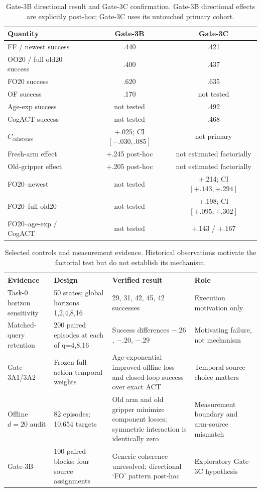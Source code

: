 \begin{table}[t]
\caption{Gate-3B directional result and Gate-3C confirmation. Gate-3B
directional effects are explicitly post-hoc; Gate-3C uses its untouched primary
cohort.}
\label{tab:directional_result}
\centering
\scriptsize
\setlength{\tabcolsep}{3.5pt}
\begin{tabular}{lcc}
\toprule
Quantity & Gate-3B & Gate-3C \\
\midrule
FF / newest success & .440 & .421 \\
OO20 / full old20 success & .400 & .437 \\
FO20 success & .620 & .635 \\
OF success & .170 & not tested \\
Age-exp success & not tested & .492 \\
CogACT success & not tested & .468 \\
\midrule
$C_{\mathrm{coherence}}$ & +.025; CI $[-.030,.085]$ & not primary \\
Fresh-arm effect & +.245 post-hoc & not estimated factorially \\
Old-gripper effect & +.205 post-hoc & not estimated factorially \\
FO20--newest & not tested & +.214; CI $[+.143,+.294]$ \\
FO20--full old20 & not tested & +.198; CI $[+.095,+.302]$ \\
FO20--age-exp / CogACT & not tested & +.143 / +.167 \\
\bottomrule
\end{tabular}
\end{table}

\begin{table}[t]
\caption{Selected controls and measurement evidence. Historical observations
motivate the factorial test but do not establish its mechanism.}
\label{tab:project_controls}
\centering
\scriptsize
\setlength{\tabcolsep}{4pt}
\begin{tabular}{p{}p{}p{}p{}}
\toprule
Evidence & Design & Verified result & Role \\
\midrule
Task-0 horizon sensitivity & 50 states; global horizons 1,2,4,8,16 &
29, 31, 42, 45, 42 successes & Execution motivation only \\
Matched-query retention & 200 paired episodes at each of q=4,8,16 &
Success differences $-.26$, $-.20$, $-.29$ & Motivating failure, not mechanism \\
Gate-3A1/3A2 & Frozen full-action temporal weights &
Age-exponential improved offline loss and closed-loop success over exact ACT &
Temporal-source choice matters \\
Offline $d=20$ audit & 82 episodes; 10,654 targets &
Old arm and old gripper minimize component losses; symmetric interaction is
identically zero & Measurement boundary and arm-source mismatch \\
Gate-3B & 100 paired blocks; four source assignments &
Generic coherence unresolved; directional `FO' pattern post-hoc &
Exploratory Gate-3C hypothesis \\
\bottomrule
\end{tabular}
\end{table}
